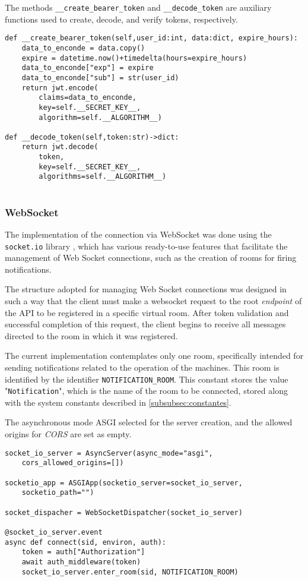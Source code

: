 The methods \texttt{\_\_create\_bearer\_token} and \texttt{\_\_decode\_token} are auxiliary functions used to create, decode, and verify tokens, respectively.

\begin{Verbatim}[fontsize=\small, baselinestretch=0.6]
def __create_bearer_token(self,user_id:int, data:dict, expire_hours):
    data_to_enconde = data.copy()
    expire = datetime.now()+timedelta(hours=expire_hours)
    data_to_enconde["exp"] = expire
    data_to_enconde["sub"] = str(user_id)
    return jwt.encode(
        claims=data_to_enconde,
        key=self.__SECRET_KEY__,
        algorithm=self.__ALGORITHM__)

def __decode_token(self,token:str)->dict:
    return jwt.decode(
        token,
        key=self.__SECRET_KEY__,
        algorithms=self.__ALGORITHM__)
    
\end{Verbatim}

\subsubsection{WebSocket}\label{subsubsec:WebSocketImplement}
The implementation of the connection via WebSocket was done using the \texttt{socket.io} library \cite{socketIoDocs}, which has various ready-to-use features that facilitate the management of Web Socket connections, such as the creation of rooms for firing notifications.

The structure adopted for managing Web Socket connections was designed in such a way that the client must make a websocket request to the root \textit{endpoint} of the \gls{API} to be registered in a specific virtual room. After token validation and successful completion of this request, the client begins to receive all messages directed to the room in which it was registered.

The current implementation contemplates only one room, specifically intended for sending notifications related to the operation of the machines. This room is identified by the identifier \texttt{NOTIFICATION\_ROOM}. This constant stores the value "\texttt{Notification}", which is the name of the room to be connected, stored along with the system constants described in \ref{subsubsec:constantes}.

The asynchronous mode \gls{ASGI} selected for the server creation, and the allowed origins for \textit{CORS} are set as empty.

\begin{Verbatim}[fontsize=\small, baselinestretch=0.6]
socket_io_server = AsyncServer(async_mode="asgi",
    cors_allowed_origins=[])

socketio_app = ASGIApp(socketio_server=socket_io_server,
    socketio_path="")

socket_dispacher = WebSocketDispatcher(socket_io_server)

@socket_io_server.event
async def connect(sid, environ, auth):
    token = auth["Authorization"]
    await auth_middleware(token)
    socket_io_server.enter_room(sid, NOTIFICATION_ROOM)
\end{Verbatim}

